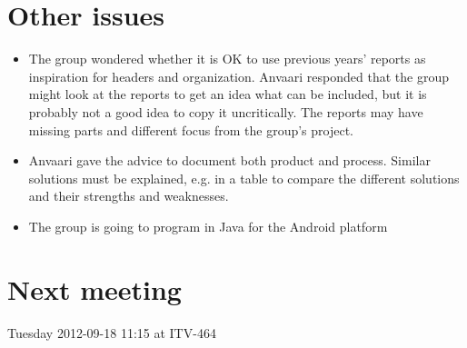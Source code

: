 \documentclass[a4paper,12pt]{article}
\begin{document}
\section{Other issues}
\begin{itemize}
\item
The group wondered whether it is OK to use previous years' reports as inspiration for headers and organization. Anvaari responded that the group might look at the reports to get an idea what can be included, but it is probably not a good idea to copy it uncritically. The reports may have missing parts and different focus from the group's project.
\item
Anvaari gave the advice to document both product and process. Similar solutions must be explained, e.g. in a table to compare the different solutions and their strengths and weaknesses.
\item
The group is going to program in Java for the Android platform
\end{itemize}
\section{Next meeting}
Tuesday 2012-09-18 11:15 at ITV-464
\end{document}
